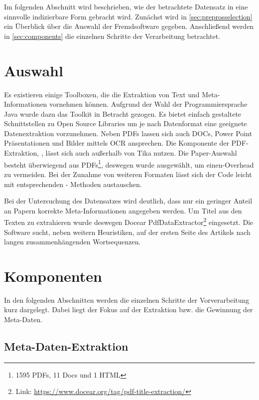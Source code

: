 
Im folgenden Abschnitt wird beschrieben, wie der betrachtete Datensatz in eine sinnvolle indizierbare Form
gebracht wird. Zunächst wird in \autoref{sec:preprosselection} ein
Überblick über die Auswahl der Fremdsoftware gegeben. Anschließend werden in
\autoref{sec:components} die einzelnen Schritte der Verarbeitung betrachtet.



\section{Auswahl}\label{sec:preprosselection}

Es existieren einige Toolboxen, die die Extraktion von Text und Meta-
Informationen vornehmen können.  Aufgrund der Wahl der
Programmiersprache Java wurde dazu das
\tika Toolkit
in Betracht gezogen. Es bietet einfach gestaltete Schnittstellen zu
Open Source Libraries um je nach Datenformat eine geeignete
Datenextraktion vorzunehmen. Neben PDFs lassen sich auch DOCs, Power
Point Präsentationen und Bilder mittels OCR ansprechen. Die Komponente der
PDF-Extraktion, \pdfbox, lässt sich auch außerhalb von Tika nutzen.
Die Paper-Auswahl besteht überwiegend aus PDFs\footnote{1595 PDFs,
  11 Docs und 1 HTML}, deswegen wurde \pdfbox ausgewählt, um einen-Overhead zu
vermeiden. Bei der Zunahme von weiteren Formaten lässt sich der Code
leicht mit entsprechenden \tika - Methoden austauschen.

Bei der Untersuchung des Datensatzes wird deutlich, dass nur ein
geringer Anteil an Papern korrekte Meta-Informationen angegeben werden. Um
Titel aus den Texten zu extrahieren wurde deswegen Docear
PdfDataExtractor\footnote{Link:
  \url{https://www.docear.org/tag/pdf-title-extraction/}}
eingesetzt. Die Software sucht, neben weitern Heuristiken, auf der
ersten Seite des Artikels nach langen zusammenhängenden Wortsequenzen.




\section{Komponenten}\label{sec:components}
In den folgenden Abschnitten werden die einzelnen Schritte der
Vorverarbeitung kurz dargelegt. Dabei liegt der Fokus auf der
Extraktion bzw. die Gewinnung der Meta-Daten.

\subsection{Meta-Daten-Extraktion}\label{sec:pdfextraction}


